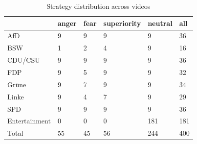 \documentclass[12pt]{article}
\begin{document}
\begin{table}[ht]
\centering
\begin{tabular}{|l|l|l|l|l|l|}
\hline
                              & \textbf{anger}             & \textbf{fear}              & \textbf{superiority}       & \textbf{neutral}            & \textbf{all} \\ \hline
AfD                           & 9                          & 9                          & 9                          & 9                           & 36           \\ \hline
BSW                           & 1                          & 2                          & 4                          & 9                           & 16           \\ \hline
CDU/CSU                       & 9                          & 9                          & 9                          & 9                           & 36           \\ \hline
FDP                           & 9                          & 5                          & 9                          & 9                           & 32           \\ \hline
Grüne                         & 9                          & 7                          & 9                          & 9                           & 34           \\ \hline
Linke                         & 9                          & 4                          & 7                          & 9                           & 29           \\ \hline
SPD                           & 9                          & 9                          & 9                          & 9                           & 36           \\ \hline
Entertainment                 & 0                          & 0                          & 0                          & 181                         & 181          \\ \hline
Total                         & 55                         & 45                         & 56                         & 244                         & 400          \\ \hline
\end{tabular}
\caption{Strategy distribution across videos}
\label{tiktok:strategy}
\end{table}
\end{document}
